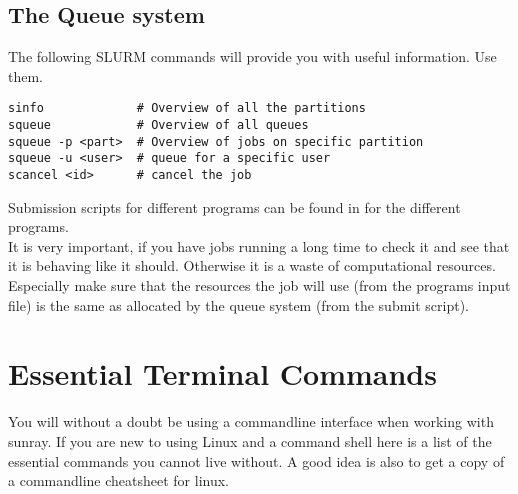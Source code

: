 \documentclass{article}
\begin{document}
\subsection*{The Queue system}

The following SLURM commands will provide you with useful information. Use them.

\begin{lstlisting}
sinfo             # Overview of all the partitions
squeue            # Overview of all queues
squeue -p <part>  # Overview of jobs on specific partition
squeue -u <user>  # queue for a specific user
scancel <id>      # cancel the job
\end{lstlisting}

Submission scripts for different programs can be found in  for the different programs.\\

It is very important, if you have jobs running a long time to check it and see that it is behaving like it should. Otherwise it is a waste of computational resources.
Especially make sure that the resources the job will use (from the programs input file) is the same as allocated by the queue system (from the submit script).\\



\newpage


\section{Essential Terminal Commands}

You will without a doubt be using a commandline interface when working with sunray.
If you are new to using Linux and a command shell here is a list of the essential commands you cannot live without.
A good idea is also to get a copy of a commandline cheatsheet for linux.\\
\end{document}

